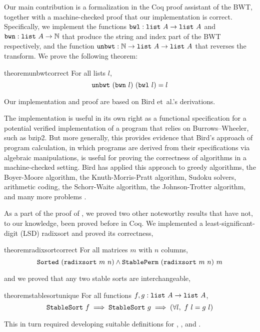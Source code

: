 \documentclass[sigplan,10pt,anonymous,review]{thesis}
\begin{document}
Our main contribution is a formalization in the Coq proof assistant of
the BWT, together with a machine-checked proof that our implementation
is correct. Specifically, we implement the functions $\texttt{bwl} :
\texttt{list}~A \to \texttt{list}~A$ and $\texttt{bwn} : \texttt{list}~A \to
\mathbb{N}$ that produce the string and index part of the BWT
respectively, and the function $\texttt{unbwt} : \mathbb{N} \to
\texttt{list}~A \to \texttt{list}~A$ that reverses the transform. We prove the
following theorem:
\begin{restatable*}{theorem}{unbwtcorrect}
  \label{thm:unbwt_correct}
  For all lists $l$,
  \begin{equation*}
    \texttt{unbwt}~(\texttt{bwn}~l)~(\texttt{bwl}~l) = l
  \end{equation*}
\end{restatable*}
Our implementation and proof are based on Bird et~al.'s derivations.

The implementation is useful in its own right as a functional
specification for a potential verified implementation of a program
that relies on Burrows--Wheeler, such as bzip2\cite{appel-func-spec}.
But more generally, this provides evidence that Bird's approach of
program calculation, in which programs are derived from their
specifications via algebraic manipulations, is useful for proving the
correctness of algorithms in a machine-checked setting. Bird has
applied this approach to greedy algorithms, the Boyer-Moore algorithm,
the Knuth-Morris-Pratt algorithm, Sudoku solvers, arithmetic coding,
the Schorr-Waite algorithm, the Johnson-Trotter algorithm, and many
more problems \cite{pearls}.

As a part of the proof of , we proved two
other noteworthy results that have not, to our knowledge, been proved
before in Coq. We implemented a least-significant-digit (LSD)
radixsort and proved its correctness,
\begin{restatable*}{theorem}{radixsortcorrect}
  \label{thm:radixsort_correct}%
  For all matrices $m$ with $n$ columns,
  \begin{equation*}
    \texttt{Sorted}~(\texttt{radixsort}~m~n) \land \texttt{StablePerm}~(\texttt{radixsort}~m~n)~m
  \end{equation*}
\end{restatable*}
and we proved that any two stable sorts are interchangeable,
\begin{restatable*}{theorem}{stablesortunique}
  \label{thm:stablesort_unique}
  For all functions $f, g: \texttt{list}~A \to \texttt{list}~A$,
  \begin{equation*}
    \texttt{StableSort}~f \implies \texttt{StableSort}~g \implies
    (\forall l,~f~l = g~l)
  \end{equation*}
\end{restatable*}
This in turn required developing suitable definitions for
, , and .
\end{document}
